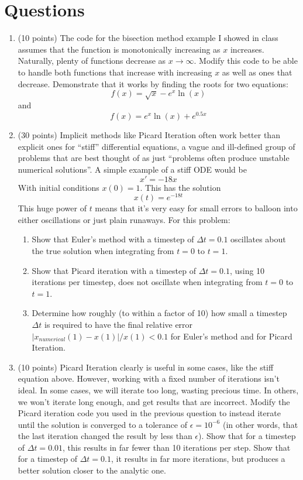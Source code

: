 \documentclass[11pt]{article}
\begin{document}
\section*{Questions}
\begin{enumerate}
    \item (10 points) The code for the bisection method example I showed in
        class assumes that the function is monotonically increasing as $x$
        increases.  Naturally, plenty of functions decrease as
        $x\rightarrow\infty$. Modify this code to be able to handle both
        functions that increase with increasing $x$ as well as ones that
        decrease.  Demonstrate that it works by finding the roots for two
        equations:
        $$ f(x) = \sqrt{x}-e^x\ln(x)$$
        and
        $$ f(x) = e^x\ln(x) + e^{0.5x}$$
    \item (30 points)  Implicit methods like Picard Iteration often work better
        than explicit ones for ``stiff'' differential equations, a vague and
        ill-defined group of problems that are best thought of as just
        ``problems often produce unstable numerical solutions''.  A simple
        example of a stiff ODE would be
        $$ x' = -18x $$
        With initial conditions $x(0) = 1$.  This has the solution
        $$ x(t) = e^{-18t} $$
        This huge power of $t$ means that it's very easy for small errors to
        balloon into either oscillations or just plain runaways.  For this
        problem: 
        \begin{enumerate}
            \item Show that Euler's method with a timestep of $\Delta t=0.1$
                oscillates about the true solution when integrating from $t=0$
                to $t=1$.
            \item Show that Picard iteration with a timestep of $\Delta t=0.1$,
                using 10 iterations per timestep, does not oscillate when
                integrating from $t=0$ to $t=1$.
            \item Determine how roughly (to within a factor of 10) how small a
                timestep $\Delta t$ is required to have the final relative error
                $|x_{numerical}(1)-x(1)|/x(1) < 0.1$ for Euler's method and for
                Picard Iteration.
        \end{enumerate}
    \item (10 points) Picard Iteration clearly is useful in some cases, like the
        stiff equation above.  However, working with a fixed number of
        iterations isn't ideal.  In some cases, we will iterate too long,
        wasting precious time.  In others, we won't iterate long enough, and get
        results that are incorrect.  Modify the Picard iteration code you used
        in the previous question to instead iterate until the solution is
        converged to a tolerance of $\epsilon=10^{-6}$ (in other words, that the last
        iteration changed the result by less than $\epsilon$).  Show that for a
        timestep of $\Delta t=0.01$, this results in far fewer than 10
        iterations per step.  Show that for a timestep of $\Delta t=0.1$, it
        results in far more iterations, but produces a better solution closer to
        the analytic one.
\end{enumerate}
\end{document}
